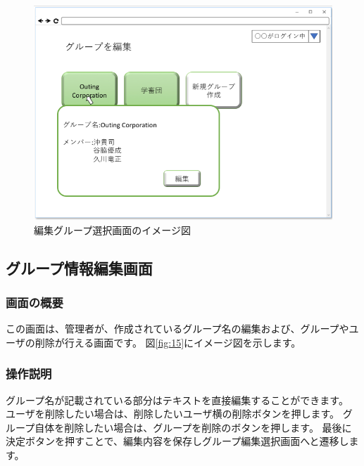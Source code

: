 \begin{figure}[htbp]
  \begin{center}
    \includegraphics[width=1\linewidth,clip]{./img/14.png}
    \caption{編集グループ選択画面のイメージ図}\label{fig:14}
  \end{center}
\end{figure}

\newpage

\subsection{グループ情報編集画面}
\subsubsection{画面の概要}
この画面は、管理者が、作成されているグループ名の編集および、グループやユーザの削除が行える画面です。
図\ref{fig:15}にイメージ図を示します。

\subsubsection{操作説明}
グループ名が記載されている部分はテキストを直接編集することができます。
ユーザを削除したい場合は、削除したいユーザ横の削除ボタンを押します。
グループ自体を削除したい場合は、グループを削除のボタンを押します。
最後に決定ボタンを押すことで、編集内容を保存しグループ編集選択画面へと遷移します。

